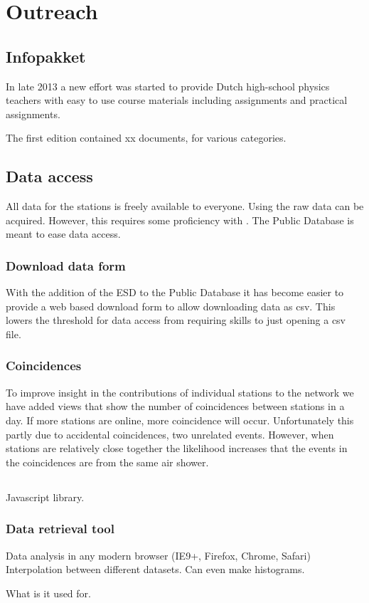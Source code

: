 \chapter{Outreach}
\label{ch:outreach}

\section{Infopakket}

In late 2013 a new effort was started to provide Dutch high-school
physics teachers with easy to use course materials including assignments
and practical assignments.

The first edition contained xx documents, for various categories.


\section{Data access}

All data for the \hisparc stations is freely available to everyone.
Using \sapphire the raw data can be acquired. However, this requires some proficiency with \python. The Public Database is meant to ease data access.


\subsection{Download data form}

With the addition of the ESD to the Public Database it has become easier
to provide a web based download form to allow downloading data as csv.
This lowers the threshold for data access from requiring \python skills
to just opening a csv file.


\subsection{Coincidences}

To improve insight in the contributions of individual stations to the
\hisparc network we have added views that show the number of
coincidences between \hisparc stations in a day. If more stations are
online, more coincidence will occur. Unfortunately this partly due to
accidental coincidences, two unrelated events. However, when stations
are relatively close together the likelihood increases that the events
in the coincidences are from the same air shower.




\section{\jsparc}

Javascript library.


\subsection{Data retrieval tool}

Data analysis in any modern browser (IE9+, Firefox, Chrome, Safari)
Interpolation between different datasets. Can even make histograms.

What is it used for.
